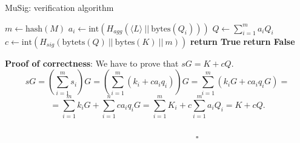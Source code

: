 \bigskip

\begin{algorithm}
	\caption{MuSig: verification algorithm}
	\label{alg:musig_ver}
	\begin{algorithmic}[1]
		\State $m \gets \text{hash}(M)$
		\State $a_i \gets \text{int}(H_{agg}(\langle L \rangle \ || \ \text{bytes}(Q_i)))$
		\EndFor
		\State $Q \gets \sum_{i = 1}^{m}a_iQ_i$
		\State $c \gets \text{int}(H_{sig}(\text{bytets}(Q) \ || \ \text{bytes}(K) \ || \ m))$
		\State \textbf{return True}
		\EndIf
		\State \textbf{return False}
		\EndProcedure
	\end{algorithmic}
\end{algorithm}

\bigskip
\noindent
{\bf Proof of correctness}: We have to prove that $sG = K + cQ$.
\\
$$sG = \left(\sum_{i = 1}^{m} s_i\right)G = \left(\sum_{i = 1}^{m}(k_i + ca_iq_i)\right)G = \sum_{i = 1}^{m}(k_iG + ca_iq_iG) =$$
$$= \sum_{i = 1}^{m}k_iG + \sum_{i = 1}^{n} ca_iq_iG = \sum_{i = 1}^{m}K_i + c\sum_{i  = 1}^{m}a_iQ_i = K + cQ.$$
\ \ \ \ \ \ \ \ \ \ \ \ \ \ \ \ \ \ \ \ \ \ \ \ \ \ \ \ \ \ \ \ \ \ \ \ \ \ \ \ \ \ \ \ \ \ \ \ \ \ \ \ \ \ \ \ \ \ \ \ \ \ \ \ \ \ \ \ \ \ \ \ \ \ \ \ \ \ \ \ \ \ \ \ \ \ \ \ \ \ \ \ \ \ \ \ \ \ \ \ \ \ \ \ \ \ \ \ \ \ \ \ \ \ \ \ \ $\square$

